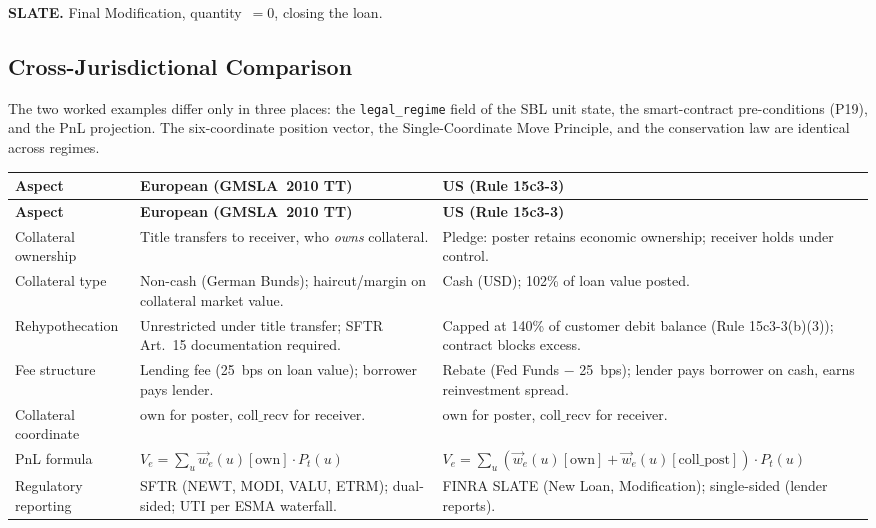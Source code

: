 \noindent\textbf{SLATE.} Final Modification, quantity~$=0$, closing the loan.

\subsection{Cross-Jurisdictional Comparison}
\label{sec:sbl-comparison}

The two worked examples differ only in three places: the \texttt{legal\_regime} field of the SBL unit state, the smart-contract pre-conditions (P19), and the PnL projection. The six-coordinate position vector, the Single-Coordinate Move Principle, and the conservation law are identical across regimes.

\begin{center}\small
\begin{longtable}{p{3.2cm} p{5.2cm} p{5.2cm}}
\toprule
\textbf{Aspect} & \textbf{European (GMSLA~2010 TT)} & \textbf{US (Rule 15c3-3)} \\
\midrule
\endfirsthead
\toprule
\textbf{Aspect} & \textbf{European (GMSLA~2010 TT)} & \textbf{US (Rule 15c3-3)} \\
\midrule
\endhead
\bottomrule
\endfoot
Collateral ownership & Title transfers to receiver, who \emph{owns} collateral. & Pledge: poster retains economic ownership; receiver holds under control. \\
\midrule
Collateral type & Non-cash (German Bunds); haircut/margin on collateral market value. & Cash (USD); 102\% of loan value posted. \\
\midrule
Rehypothecation & Unrestricted under title transfer; SFTR Art.~15 documentation required. & Capped at 140\% of customer debit balance (Rule 15c3-3(b)(3)); contract blocks excess. \\
\midrule
Fee structure & Lending fee (25~bps on loan value); borrower pays lender. & Rebate (Fed Funds $-$ 25~bps); lender pays borrower on cash, earns reinvestment spread. \\
\midrule
Collateral coordinate & $\mathrm{own}$ for poster, $\mathrm{coll\_recv}$ for receiver. & $\mathrm{own}$ for poster, $\mathrm{coll\_recv}$ for receiver. \\
\midrule
PnL formula & $V_e = \sum_u \vec{w}_e(u)[\mathrm{own}] \cdot P_t(u)$ & $V_e = \sum_u (\vec{w}_e(u)[\mathrm{own}] + \vec{w}_e(u)[\mathrm{coll\_post}]) \cdot P_t(u)$ \\
\midrule
Regulatory reporting & SFTR (NEWT, MODI, VALU, ETRM); dual-sided; UTI per ESMA waterfall. & FINRA SLATE (New Loan, Modification); single-sided (lender reports). \\

\end{longtable}
\end{center}
